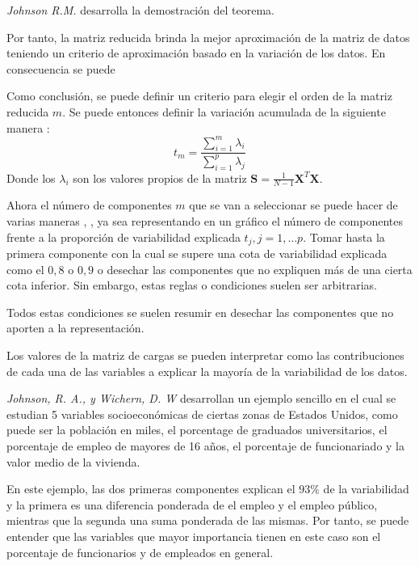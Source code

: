 \noindent \emph{Johnson R.M.} \cite{Johnson 1963} desarrolla la demostración del teorema. 

\noindent Por tanto, la matriz reducida brinda la mejor aproximación de la matriz de datos teniendo un criterio de aproximación basado en la variación de los datos. En consecuencia se puede 

\noindent Como conclusión, se puede definir un criterio para elegir el orden de la matriz reducida $m$. Se puede entonces definir la variación acumulada de la siguiente manera \cite{Chatfield 1989}:
\begin{equation}
t_m=\dfrac{\sum_{i=1}^{m}\lambda_i}{\sum_{i=1}^{p}\lambda_j}
\end{equation}
\noindent Donde los $\lambda_i$ son los valores propios de la matriz $\textbf{S}=\frac{1}{N-1}\textbf{X}^T\textbf{X}$.

\noindent Ahora el número de componentes $m$ que se van a seleccionar se puede hacer de varias maneras \cite{Peña 2002}, \cite{Jollife 1986}, ya sea representando en un gráfico el número de componentes frente a la proporción de variabilidad explicada $t_j, j=1,\ldots p$. Tomar hasta la primera componente con la cual se supere una cota de variabilidad explicada como el $0,8$ o $0,9$ \cite {Jollife 1986} o desechar las componentes que no expliquen más de una cierta cota inferior. Sin embargo, estas reglas o condiciones suelen ser arbitrarias.

\noindent Todos estas condiciones se suelen resumir en desechar las componentes que no aporten a la representación. 

\noindent Los valores de la matriz de cargas se pueden interpretar como las contribuciones de cada una de las variables a explicar la mayoría de la variabilidad de los datos.

\noindent\emph{Johnson, R. A., y Wichern, D. W} \cite{Johnson 2007} desarrollan un ejemplo sencillo en el cual se estudian 5 variables socioeconómicas de ciertas zonas de Estados Unidos, como puede ser la población en miles, el porcentage de graduados universitarios, el porcentaje de empleo de mayores de 16 años, el porcentaje de funcionariado y la valor medio de la vivienda.

\noindent En este ejemplo, las dos primeras componentes explican el $93\%$ de la variabilidad y la primera es una diferencia ponderada de el empleo y el empleo público, mientras que la segunda una suma ponderada de las mismas. Por tanto, se puede entender que las variables que mayor importancia tienen en este caso son el porcentaje de funcionarios y de empleados en general.

